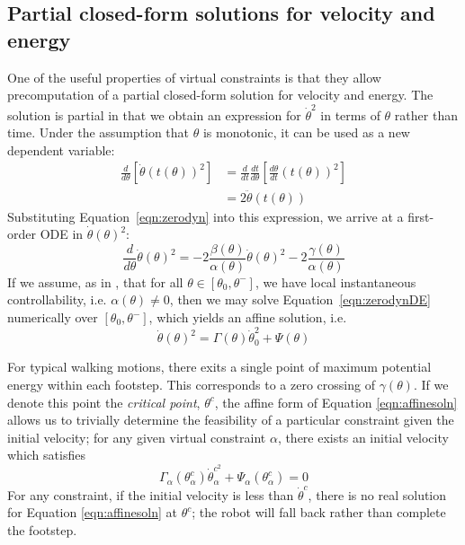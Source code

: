\subsection{Partial closed-form solutions for velocity and energy}
One of the useful properties of virtual constraints is that they allow precomputation of a partial closed-form solution for velocity and energy. The solution is partial in that we obtain an expression for $\dot{\theta}^2$ in terms of $\theta$ rather than time. Under the assumption that $\theta$ is monotonic, it can be used as a new dependent variable:
\begin{align*}
	\frac{d}{d\theta}\left[\dot{\theta}\left(t(\theta)\right)^2\right] &= 
	\frac{d}{dt}\frac{dt}{d\theta}\left[\frac{d\theta}{dt}\left(t(\theta)\right)^2\right] \nonumber \\ 
	&= 2\ddot{\theta}\left(t(\theta)\right)
\end{align*}
Substituting Equation~\ref{eqn:zerodyn} into this expression, we arrive at a first-order ODE in $\dot{\theta}(\theta)^2$:
\begin{equation}\label{eqn:zerodynDE}
	\frac{d}{d\theta}\dot{\theta}(\theta)^2 = -2\frac{\beta(\theta)}{\alpha(\theta)}
		\dot{\theta}(\theta)^2 - 2\frac{\gamma(\theta)}{\alpha(\theta)}
\end{equation}
If we assume, as in \cite{manchester13planning}, that for all $\theta \in [\theta_0, \theta^-]$, we have local instantaneous controllability, i.e. $\alpha(\theta) \neq 0$, then we may solve Equation~\ref{eqn:zerodynDE} numerically over $[\theta_0, \theta^-]$, which yields an affine solution, i.e.
\begin{equation} \label{eqn:affinesoln}
	\dot{\theta}(\theta)^2 = \Gamma(\theta)\dot{\theta}_0^2 + \Psi(\theta)
\end{equation}

For typical walking motions, there exits a single point of maximum potential energy within each footstep. This corresponds to a zero crossing of $\gamma(\theta)$. If we denote this point the \textit{critical point}, $\theta^c$, the affine form of Equation \ref{eqn:affinesoln} allows us to trivially determine the feasibility of a particular constraint given the initial velocity; for any given virtual constraint $\alpha$, there exists an initial velocity which satisfies
\begin{equation} \label{eqn:critvel}
	\Gamma_\alpha(\theta_\alpha^c)\dot{\theta}_\alpha^{c^2} + \Psi_\alpha(\theta_\alpha^c) = 0
\end{equation}
For any constraint, if the initial velocity is less than $\dot{\theta}^c$, there is no real solution for Equation \ref{eqn:affinesoln} at $\theta^c$; the robot will fall back rather than complete the footstep.

